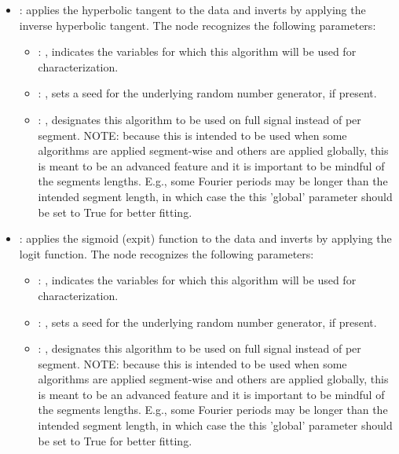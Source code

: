\begin{itemize}
    \item {}:
      applies the hyperbolic tangent to the data and inverts by applying the
      inverse hyperbolic tangent.
      The  node recognizes the following parameters:
        \begin{itemize}
          \item {}: , 
            indicates the variables for which this algorithm will be used for characterization.
          \item {}: , 
            sets a seed for the underlying random number generator, if present.
          \item {}: , 
            designates this algorithm to be used on full signal instead of per
            segment. NOTE: because this is intended to be used when some algorithms are
            applied segment-wise and others are applied globally, this is meant to be an
            advanced feature and it is important to be mindful of the segments lengths.
            E.g., some Fourier periods may be longer than the intended segment length, in
            which case the this 'global' parameter should be set to True for better
            fitting. 
      \end{itemize}

    \item {}:
      applies the sigmoid (expit) function to the data and inverts by applying
      the logit function.
      The  node recognizes the following parameters:
        \begin{itemize}
          \item {}: , 
            indicates the variables for which this algorithm will be used for characterization.
          \item {}: , 
            sets a seed for the underlying random number generator, if present.
          \item {}: , 
            designates this algorithm to be used on full signal instead of per
            segment. NOTE: because this is intended to be used when some algorithms are
            applied segment-wise and others are applied globally, this is meant to be an
            advanced feature and it is important to be mindful of the segments lengths.
            E.g., some Fourier periods may be longer than the intended segment length, in
            which case the this 'global' parameter should be set to True for better
            fitting. 
      \end{itemize}


\end{itemize}
